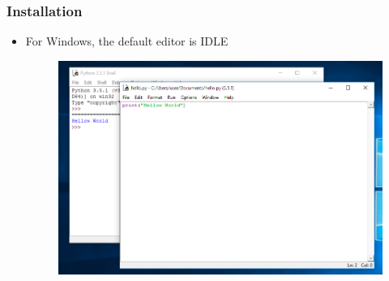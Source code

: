 
\begin{frame}
\frametitle{Installation}

\begin{itemize}
\item For Windows, the default editor is IDLE
\begin{figure}
\includegraphics[width=0.8\linewidth]{IDLE.png}
\end{figure}
\end{itemize}

\end{frame}
